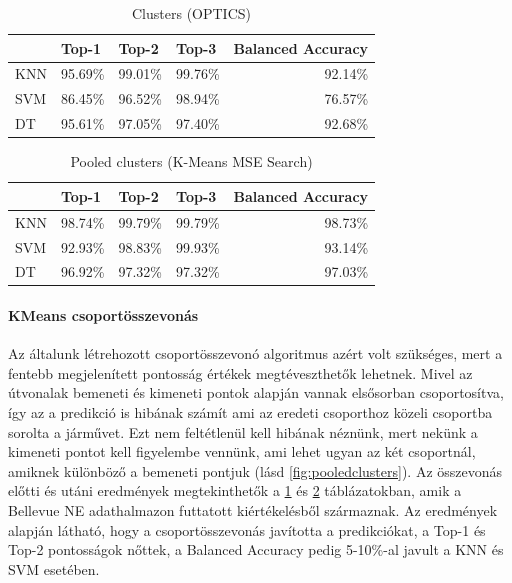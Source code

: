 \documentclass[12pt,a4paper]{article}
\begin{document}
\begin{table}[ht]
    \centering
    \caption{Clusters (OPTICS)}
    \label{tab:clusters-optics}
    \begin{tabular}{@{}lrrrr@{}}
        \toprule
            & \multicolumn{1}{l}{Top-1} & \multicolumn{1}{l}{Top-2} & \multicolumn{1}{l}{Top-3} & \multicolumn{1}{l}{Balanced Accuracy} \\ \midrule
        KNN & 95.69\%                   & 99.01\%                   & 99.76\%                   & 92.14\%                               \\
        SVM & 86.45\%                   & 96.52\%                   & 98.94\%                   & 76.57\%                               \\
        DT  & 95.61\%                   & 97.05\%                   & 97.40\%                   & 92.68\%                               \\ \bottomrule
    \end{tabular}
\end{table}
\begin{table}[ht]
    \centering
    \caption{Pooled clusters (K-Means MSE Search)}
    \label{tab:pooled-clusters}
    \begin{tabular}{@{}lrrrr@{}}
        \toprule
            & \multicolumn{1}{l}{Top-1} & \multicolumn{1}{l}{Top-2} & \multicolumn{1}{l}{Top-3} & \multicolumn{1}{l}{Balanced Accuracy} \\ \midrule
        KNN & 98.74\%                   & 99.79\%                   & 99.79\%                   & 98.73\%                               \\
        SVM & 92.93\%                   & 98.83\%                   & 99.93\%                   & 93.14\%                               \\
        DT  & 96.92\%                   & 97.32\%                   & 97.32\%                   & 97.03\%                               \\ \bottomrule
    \end{tabular}
\end{table}


\paragraph{KMeans csoportösszevonás} Az általunk létrehozott csoportösszevonó algoritmus azért volt szükséges, mert a fentebb megjelenített pontosság értékek megtéveszthetők lehetnek. Mivel az útvonalak bemeneti és kimeneti pontok alapján vannak elsősorban csoportosítva, így az a predikció is hibának számít ami az eredeti csoporthoz közeli csoportba sorolta a járművet. Ezt nem feltétlenül kell hibának néznünk, mert nekünk a kimeneti pontot kell figyelembe vennünk, ami lehet ugyan az két csoportnál, amiknek különböző a bemeneti pontjuk (lásd \ref{fig:pooledclusters}). Az összevonás előtti és utáni eredmények megtekinthetők a \ref{tab:clusters-optics} és \ref{tab:pooled-clusters} táblázatokban, amik a Bellevue NE adathalmazon futtatott kiértékelésből származnak. Az eredmények alapján látható, hogy a csoportösszevonás javította a predikciókat, a Top-1 és Top-2 pontosságok nőttek, a Balanced Accuracy pedig 5-10\%-al javult a KNN és SVM esetében.
\end{document}
